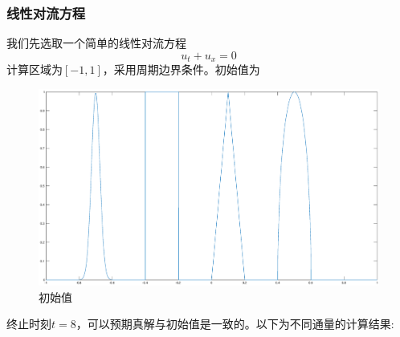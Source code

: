 \documentclass[a4paper,  11pt]{ctexart}
\begin{document}
\subsubsection{线性对流方程}
我们先选取一个简单的线性对流方程
\[ 
    u_t + u_x = 0
\] 
计算区域为$[-1,1]$，采用周期边界条件。初始值为 
\begin{figure}[H]
  \begin{center}
    \includegraphics[width=\textwidth]{./images/advection_t0.eps}
  \end{center}
  \caption{初始值}
\end{figure}
终止时刻$t=8$，可以预期真解与初始值是一致的。以下为不同通量的计算结果:
\end{document}
